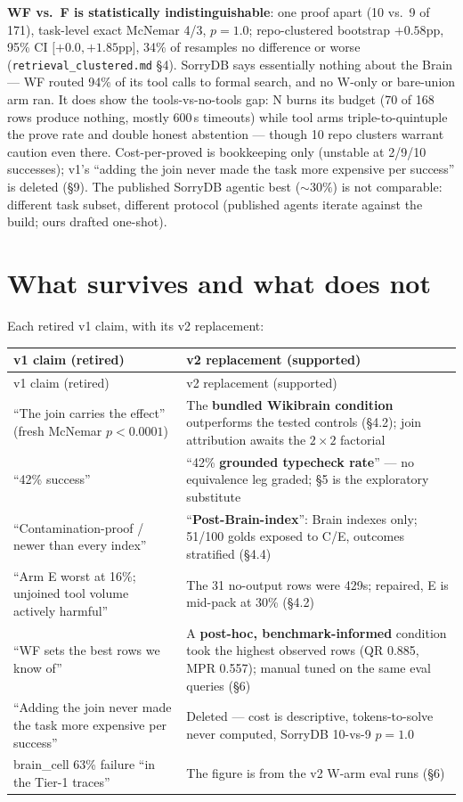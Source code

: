 \documentclass[10pt]{article}
\newcommand{\code}[1]{\texttt{#1}}
\begin{document}
\textbf{WF vs.\ F is statistically indistinguishable}: one proof apart
(10 vs.\ 9 of 171), task-level exact McNemar 4/3, $p=1.0$; repo-clustered
bootstrap $+0.58$pp, 95\% CI $[+0.0, +1.85$pp$]$, 34\% of resamples no
difference or worse (\code{retrieval\_clustered.md} \S4). SorryDB says
essentially nothing about the Brain --- WF routed 94\% of its tool calls
to formal search, and no W-only or bare-union arm ran. It does show the
tools-vs-no-tools gap: N burns its budget (70 of 168 rows produce nothing,
mostly 600\,s timeouts) while tool arms triple-to-quintuple the prove rate
and double honest abstention --- though 10 repo clusters warrant caution
even there. Cost-per-proved is bookkeeping only (unstable at 2/9/10
successes); v1's ``adding the join never made the task more expensive per
success'' is deleted (\S9). The published SorryDB agentic best
(${\sim}30\%$) is not comparable: different task subset, different
protocol (published agents iterate against the build; ours drafted
one-shot).

\section{What survives and what does not}\label{sec:survives}

Each retired v1 claim, with its v2 replacement:

{\footnotesize
\begin{longtable}{@{}p{}p{}@{}}
\toprule
v1 claim (retired) & v2 replacement (supported) \\
\midrule
\endfirsthead
\toprule
v1 claim (retired) & v2 replacement (supported) \\
\midrule
\endhead
\bottomrule
\endfoot
\bottomrule
\endlastfoot
``The join carries the effect'' (fresh McNemar $p<0.0001$) & The
\textbf{bundled Wikibrain condition} outperforms the tested controls
(\S4.2); join attribution awaits the $2\times2$ factorial \\
``42\% success'' & ``42\% \textbf{grounded typecheck rate}'' --- no
equivalence leg graded; \S5 is the exploratory substitute \\
``Contamination-proof / newer than every index'' &
``\textbf{Post-Brain-index}'': Brain indexes only; 51/100 golds exposed to
C/E, outcomes stratified (\S4.4) \\
``Arm E worst at 16\%; unjoined tool volume actively harmful'' & The 31
no-output rows were 429s; repaired, E is mid-pack at 30\% (\S4.2) \\
``WF sets the best rows we know of'' & A \textbf{post-hoc,
benchmark-informed} condition took the highest observed rows (QR 0.885,
MPR 0.557); manual tuned on the same eval queries (\S6) \\
``Adding the join never made the task more expensive per success'' &
Deleted --- cost is descriptive, tokens-to-solve never computed, SorryDB
10-vs-9 $p=1.0$ \\
brain\_cell 63\% failure ``in the Tier-1 traces'' & The figure is from the
v2 W-arm eval runs (\S6) \\
\end{longtable}
}
\end{document}

